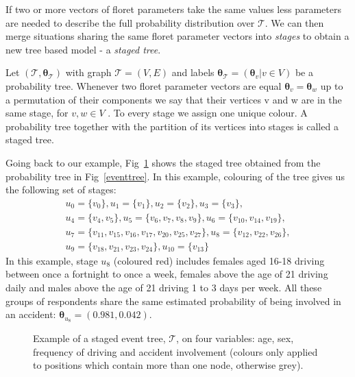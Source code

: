 \documentclass[runningheads]{llncs}
\begin{document}
If two or more vectors of floret parameters take the same values less parameters are needed to describe the full probability distribution over $\mathcal{T}$. We can then merge situations sharing the same floret parameter vectors into \emph{stages} to obtain a new tree based model - a \emph{staged tree}.
\begin{definition}
Let $(\mathcal{T} , \boldsymbol{\theta}_{\mathcal{T}})$ with graph $\mathcal{T} = (V, E)$ and labels $ \boldsymbol{\theta}_{\mathcal{T}} = ( \boldsymbol{\theta}_v | v \in V)$ be a probability tree. Whenever two floret parameter vectors are equal $\boldsymbol{\theta}_v = \boldsymbol{\theta}_w$ up to a permutation of their components we say that their vertices v and w are in the same stage, for $v, w \in V$ . To every stage we assign one unique colour. A probability tree together with the partition of its vertices into stages is called a staged tree.
\end{definition}
Going back to our example, Fig~\ref{stagedtree} shows the staged tree obtained from the probability tree in Fig~\ref{eventtree}. In this example, colouring of the tree gives us the following set of stages:
\begin{gather*}
u_0 = \{v_0\}, u_1 = \{v_1\}, u_2 = \{v_2\}, u_3 = \{v_3\}, \\
u_4 = \{v_4, v_5\}, u_5 = \{v_6, v_7, v_8, v_9\}, u_6 = \{v_{10}, v_{14}, v_{19}\}, \\
u_7 = \{v_{11}, v_{15}, v_{16}, v_{17}, v_{20}, v_{25}, v_{27}\}, u_8 = \{v_{12}, v_{22}, v_{26}\}, \\ u_9 = \{v_{18}, v_{21}, v_{23}, v_{24}\}, u_{10} = \{v_{13}\}
\end{gather*}
In this example, stage $u_{8}$ (coloured red) includes females aged 16-18 driving between once a fortnight to once a week, females above the age of 21 driving daily and males above the age of 21 driving 1 to 3 days per week. All these groups of respondents share the same estimated probability of being involved in an accident: $\boldsymbol{\theta}_{u_8} = (0.981, 0.042)$. 
\begin{figure}
\centering

\caption{Example of a staged event tree, $\mathcal{T}$, on four variables: age, sex, frequency of driving and accident involvement (colours only applied to positions which contain more than one node, otherwise grey).}
\label{stagedtree}
\end{figure}
\end{document}
